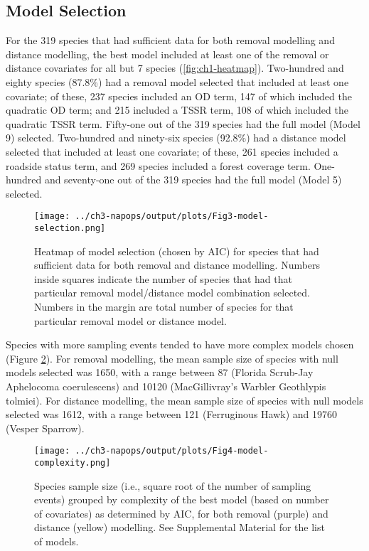 \subsection{Model Selection}
\par For the 319 species that had sufficient data for both removal modelling and distance modelling, the best model included at least one of the removal or distance covariates for all but 7 species (\autoref{fig:ch1-heatmap}). Two-hundred and eighty species (87.8\%) had a removal model selected that included at least one covariate; of these, 237 species included an OD term, 147 of which included the quadratic OD term; and 215 included a TSSR term, 108 of which included the quadratic TSSR term. Fifty-one out of the 319 species had the full model (Model 9) selected. Two-hundred and ninety-six species (92.8\%) had a distance model selected that included at least one covariate; of these, 261 species included a roadside status term, and 269 species included a forest coverage term. One-hundred and seventy-one out of the 319 species had the full model (Model 5) selected.

\begin{figure}[h]
	\centering
	\texttt{[image: ../ch3-napops/output/plots/Fig3-model-selection.png]}
	\caption{\label{fig:ch1-heatmap}Heatmap of model selection (chosen by AIC) for species that had sufficient data for both removal and distance modelling. Numbers inside squares indicate the number of species that had that particular removal model/distance model combination selected. Numbers in the margin are total number of species for that particular removal model or distance model.}
\end{figure}

\par Species with more sampling events tended to have more complex models chosen (Figure \ref{fig:ch1-complexity}). For removal modelling, the mean sample size of species with null models selected was 1650, with a range between 87 (Florida Scrub-Jay Aphelocoma coerulescens) and 10120 (MacGillivray’s Warbler Geothlypis tolmiei). For distance modelling, the mean sample size of species with null models selected was 1612, with a range between 121 (Ferruginous Hawk) and 19760 (Vesper Sparrow).

\begin{figure}[h]
	\centering
	\texttt{[image: ../ch3-napops/output/plots/Fig4-model-complexity.png]}
	\caption{\label{fig:ch1-complexity}Species sample size (i.e., square root of the number of sampling events) grouped by complexity of the best model (based on number of covariates) as determined by AIC, for both removal (purple) and distance (yellow) modelling. See Supplemental Material for the list of models.}
\end{figure}

